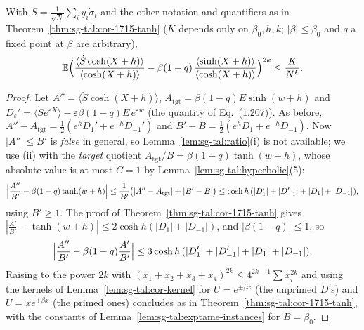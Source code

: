 \begin{theorem}
\label{thm:sg-tal:cor-1715-reaction}
  \leanok
{}
With $\dot S=\frac1{\sqrt N}\sum_iy_i\dot\sigma_i$ and the other notation and quantifiers as in Theorem~\ref{thm:sg-tal:cor-1715-tanh} ($K$ depends only on $\beta_0,h,k$; $|\beta|\le\beta_0$ and $q$ a fixed point at $\beta$ are arbitrary),
\[
\mathbb E\Bigl(\frac{\langle\dot S\cosh(X+h)\rangle}{\langle\cosh(X+h)\rangle}-\beta(1-q)\,\frac{\langle\sinh(X+h)\rangle}{\langle\cosh(X+h)\rangle}\Bigr)^{2k}\le\frac K{N^k}.
\]
\end{theorem}
\begin{proof}
  \leanok
Let $A''=\langle\dot S\cosh(X+h)\rangle$, $A_{\mathrm{tgt}}=\beta(1-q)E\sinh(w+h)$ and $D_\varepsilon'=\langle\dot Se^{\varepsilon X}\rangle-\varepsilon\beta(1-q)E\,e^{\varepsilon w}$ (the quantity of Eq.~(1.207)).  As before,
$A''-A_{\mathrm{tgt}}=\frac12(e^hD_1'+e^{-h}D_{-1}')$ and $B'-B=\frac12(e^hD_1+e^{-h}D_{-1})$.  Now $|A''|\le B'$ is \emph{false} in general, so Lemma~\ref{lem:sg-tal:ratio}(i) is not available;
we use (ii) with the \emph{target} quotient $A_{\mathrm{tgt}}/B=\beta(1-q)\tanh(w+h)$, whose absolute value is at most $C=1$ by Lemma~\ref{lem:sg-tal:hyperbolic}(5):
\[
\Bigl|\frac{A''}{B'}-\beta(1-q)\tanh(w+h)\Bigr|\le\frac1{B'}\bigl(|A''-A_{\mathrm{tgt}}|+|B'-B|\bigr)\le\cosh h\,(|D_1'|+|D_{-1}'|+|D_1|+|D_{-1}|),
\]
using $B'\ge1$.  The proof of Theorem~\ref{thm:sg-tal:cor-1715-tanh} gives $|\frac{A'}{B'}-\tanh(w+h)|\le2\cosh h(|D_1|+|D_{-1}|)$, and $|\beta(1-q)|\le1$, so
\[
\Bigl|\frac{A''}{B'}-\beta(1-q)\frac{A'}{B'}\Bigr|\le3\cosh h\,(|D_1'|+|D_{-1}'|+|D_1|+|D_{-1}|).
\]
Raising to the power $2k$ with $(x_1+x_2+x_3+x_4)^{2k}\le4^{2k-1}\sum x_i^{2k}$ and using the kernels of Lemma~\ref{lem:sg-tal:cor-kernel} for $U=e^{\pm\beta x}$ (the unprimed $D$'s) and $U=xe^{\pm\beta x}$ (the primed ones) concludes as in Theorem~\ref{thm:sg-tal:cor-1715-tanh}, with the constants of Lemma~\ref{lem:sg-tal:exptame-instances} for $B=\beta_0$.
\end{proof}

